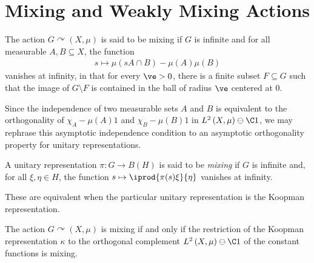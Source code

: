 \documentclass[10pt]{mypackage}
\begin{document}
\section{Mixing and Weakly Mixing Actions}%
\begin{definition}
  The action $G\curvearrowright \left( X,\mu \right)$ is said to be mixing if $G$ is infinite and for all measurable $A,B\subseteq X$, the function
  \begin{align*}
    s\mapsto \mu\left( sA\cap B \right)-\mu\left( A \right)\mu\left( B \right)
  \end{align*}
  vanishes at infinity, in that for every $\ve > 0$, there is a finite subset $F\subseteq G$ such that the image of $G\setminus F$ is contained in the ball of radius $\ve$ centered at $0$.
\end{definition}
Since the independence of two measurable sets $A$ and $B$ is equivalent to the orthogonality of $\chi_A-\mu\left( A \right)1$ and $\chi_B - \mu\left( B \right)1$ in $L^2\left( X,\mu \right)\ominus \C 1$, we may rephrase this asymptotic independence condition to an asymptotic orthogonality property for unitary representations.
\begin{definition}
  A unitary representation $\pi\colon G\rightarrow B\left( H \right)$ is said to be \textit{mixing} if $G$ is infinite and, for all $\xi,\eta\in H$, the function $s\mapsto \iprod{\pi(s)\xi}{\eta}$ vanishes at infinity.
\end{definition}
These are equivalent when the particular unitary representation is the Koopman representation.
\begin{proposition}
  The action $G\curvearrowright \left( X,\mu \right)$ is mixing if and only if the restriction of the Koopman representation $\kappa$ to the orthogonal complement $L^2\left( X,\mu \right)\ominus \C 1$ of the constant functions is mixing.
\end{proposition}
\end{document}
